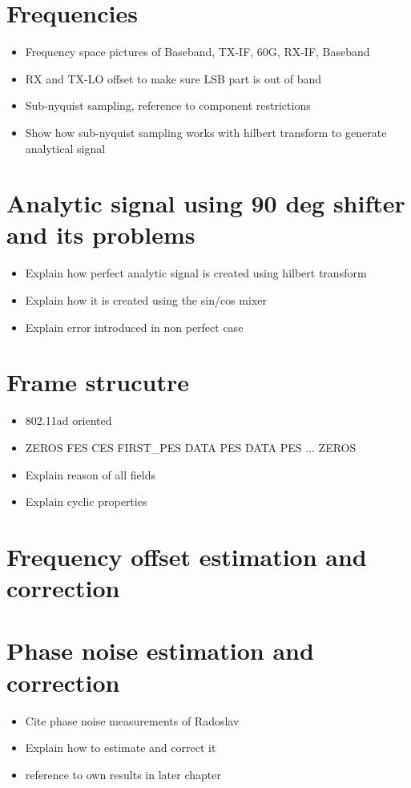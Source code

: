 \section{Frequencies}
\begin{itemize}
\item Frequency space pictures of Baseband, TX-IF, 60G, RX-IF, Baseband
\item RX and TX-LO offset to make sure LSB part is out of band
\item Sub-nyquist sampling, reference to component restrictions
\item Show how sub-nyquist sampling works with hilbert transform to generate analytical signal
\end{itemize}

\section{Analytic signal using 90 deg shifter and its problems}
\begin{itemize}
\item Explain how perfect analytic signal is created using hilbert transform
\item Explain how it is created using the sin/cos mixer
\item Explain error introduced in non perfect case
\end{itemize}

\section{Frame strucutre}
\begin{itemize}
\item 802.11ad oriented
\item ZEROS FES CES FIRST\_PES DATA PES DATA PES ... ZEROS
\item Explain reason of all fields
\item Explain cyclic properties
\end{itemize}

\section{Frequency offset estimation and correction}

\section{Phase noise estimation and correction}
\begin{itemize}
\item Cite phase noise measurements of Radoslav
\item Explain how to estimate and correct it
\item reference to own results in later chapter
\end{itemize}


